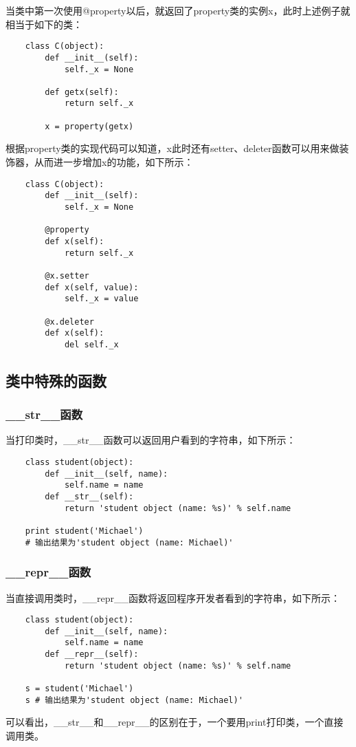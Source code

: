 \documentclass[a4paper,left=2.5cm,right=2.5cm,11pt]{article}
\begin{document}
	当类中第一次使用@property以后，就返回了property类的实例x，此时上述例子就相当于如下的类：
	\begin{lstlisting}
	class C(object):
		def __init__(self):
			self._x = None

		def getx(self):
			return self._x

		x = property(getx)
	\end{lstlisting}

	根据property类的实现代码可以知道，x此时还有setter、deleter函数可以用来做装饰器，从而进一步增加x的功能，如下所示：
	\begin{lstlisting}
	class C(object):
		def __init__(self):
			self._x = None
		
		@property
		def x(self):
			return self._x

		@x.setter
		def x(self, value):
			self._x = value

		@x.deleter
		def x(self):
			del self._x
	\end{lstlisting}

\subsection{类中特殊的函数}
\subsubsection{\_\_str\_\_函数}
	当打印类时，\_\_str\_\_函数可以返回用户看到的字符串，如下所示：
	\begin{lstlisting}
	class student(object):
		def __init__(self, name):
			self.name = name
		def __str__(self):
			return 'student object (name: %s)' % self.name

	print student('Michael')
	# 输出结果为'student object (name: Michael)'
	\end{lstlisting}

\subsubsection{\_\_repr\_\_函数}
	当直接调用类时，\_\_repr\_\_函数将返回程序开发者看到的字符串，如下所示：
	\begin{lstlisting}
	class student(object):
		def __init__(self, name):
			self.name = name
		def __repr__(self):
			return 'student object (name: %s)' % self.name
	
	s = student('Michael')
	s # 输出结果为'student object (name: Michael)'
	\end{lstlisting}

	可以看出，\_\_str\_\_和\_\_repr\_\_的区别在于，一个要用print打印类，一个直接调用类。
\end{document}
